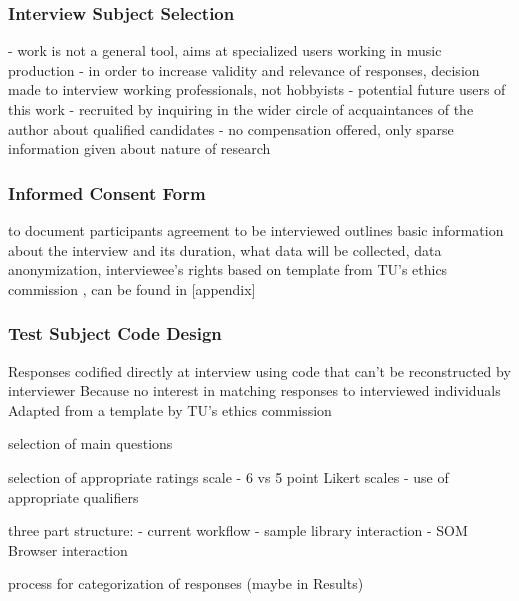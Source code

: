 \bigskip


\subsubsection{Interview Subject Selection}
\label{subsubsec:subject_selection}

- work is not a general tool, aims at specialized users working in music
production
- in order to increase validity and relevance of responses, decision made
to interview working professionals, not hobbyists
- potential future users of this work
- recruited by inquiring in the wider circle
of acquaintances of the author about qualified candidates
- no compensation offered, only sparse information given about nature of
research

\subsubsection{Informed Consent Form}
\label{subsubsec:consent_form}

to document participants agreement to be interviewed
outlines basic information about the interview and its duration, what data will
be collected, data anonymization, interviewee's rights
based on template from TU's ethics commission \citep{web:ethics2019}, can be
found in [appendix]

\subsubsection{Test Subject Code Design}
\label{subsubsec:subject_code}

Responses codified directly at interview using code that can't be reconstructed
by interviewer
Because no interest in matching responses to interviewed individuals
Adapted from a template by TU's ethics commission \citep{web:ethics2019}

\bigskip
selection of main questions

\bigskip
selection of appropriate ratings scale
- 6 vs 5 point Likert scales
- use of appropriate qualifiers

\bigskip
three part structure:
- current workflow
- sample library interaction
- SOM Browser interaction

\bigskip
process for categorization of responses (maybe in Results)
